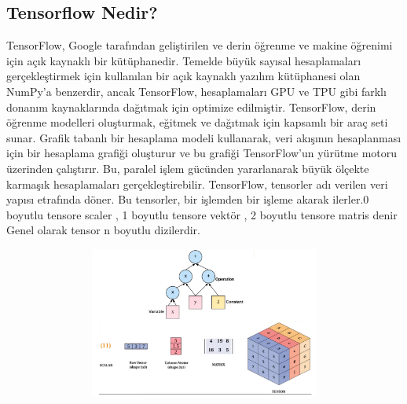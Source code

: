 \documentclass[12pt]{article}
\begin{document}
\subsection{Tensorflow Nedir?}
TensorFlow, Google tarafından geliştirilen ve derin öğrenme ve makine öğrenimi için açık kaynaklı bir kütüphanedir. Temelde büyük sayısal hesaplamaları gerçekleştirmek için kullanılan bir açık kaynaklı yazılım kütüphanesi olan NumPy’a benzerdir, ancak TensorFlow, hesaplamaları GPU ve TPU gibi farklı donanım kaynaklarında dağıtmak için optimize edilmiştir. TensorFlow, derin öğrenme modelleri oluşturmak, eğitmek ve dağıtmak için kapsamlı bir araç seti sunar. Grafik tabanlı bir hesaplama modeli kullanarak, veri akışının hesaplanması için bir hesaplama grafiği oluşturur ve bu grafiği TensorFlow’un yürütme motoru üzerinden çalıştırır. Bu, paralel işlem gücünden yararlanarak büyük ölçekte karmaşık hesaplamaları gerçekleştirebilir. TensorFlow, tensorler adı verilen veri yapısı etrafında döner. Bu tensorler, bir işlemden bir işleme akarak ilerler.0 boyutlu tensore scaler , 1 boyutlu tensore vektör , 2 boyutlu tensore matris denir Genel olarak tensor n boyutlu dizilerdir.
\begin{figure}[h]
    \centering
    \includegraphics[width=5\textwidth, height=5cm, keepaspectratio]{tensor.png}
    \label{fig:enter-label}
\end{figure}
\end{document}
